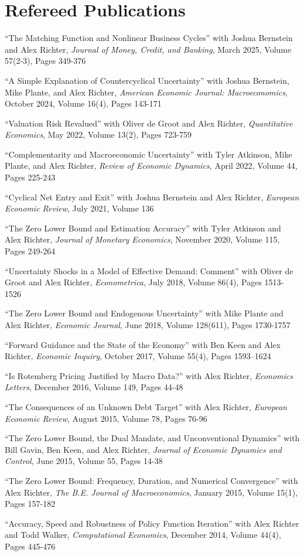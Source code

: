 \documentclass[10pt,letterpaper,en-US]{article}
\begin{document}
\section*{Refereed Publications}
\begin{etaremune}
\item ``The Matching Function and Nonlinear Business Cycles'' with Joshua Bernstein and Alex Richter, \emph{Journal of Money, Credit, and Banking}, March 2025, Volume 57(2-3), Pages 349-376
\item ``A Simple Explanation of Countercyclical Uncertainty'' with Joshua Bernstein, Mike Plante, and Alex Richter, \emph{American Economic Journal: Macroeconomics}, October 2024, Volume 16(4), Pages 143-171
\item ``Valuation Risk Revalued'' with Oliver de Groot and Alex Richter, \emph{Quantitative Economics}, May 2022, Volume 13(2), Pages 723-759
\item ``Complementarity and Macroeconomic Uncertainty'' with Tyler Atkinson, Mike Plante, and Alex Richter, \emph{Review of Economic Dynamics}, April 2022, Volume 44, Pages 225-243
\item ``Cyclical Net Entry and Exit'' with Joshua Bernstein and Alex Richter, \emph{European Economic Review}, July 2021, Volume 136
\item ``The Zero Lower Bound and Estimation Accuracy'' with Tyler Atkinson and Alex Richter, \emph{Journal of Monetary Economics}, November 2020, Volume 115, Pages 249-264
\item ``Uncertainty Shocks in a Model of Effective Demand: Comment'' with Oliver de Groot and Alex Richter, \emph{Econometrica}, July 2018, Volume 86(4), Pages 1513-1526
\item ``The Zero Lower Bound and Endogenous Uncertainty'' with Mike Plante and Alex Richter, \emph{Economic Journal}, June 2018, Volume 128(611), Pages 1730-1757
\item ``Forward Guidance and the State of the Economy'' with Ben Keen and Alex Richter, \emph{Economic Inquiry}, October 2017, Volume 55(4), Pages 1593–1624
\item ``Is Rotemberg Pricing Justified by Macro Data?'' with Alex Richter, \emph{Economics Letters}, December 2016, Volume 149, Pages 44-48
\item ``The Consequences of an Unknown Debt Target'' with Alex Richter, \emph{European Economic Review}, August 2015, Volume 78, Pages 76-96
\item ``The Zero Lower Bound, the Dual Mandate, and Unconventional Dynamics'' with Bill Gavin, Ben Keen, and Alex Richter, \emph{Journal of Economic Dynamics and Control}, June 2015, Volume 55, Pages 14-38
\item ``The Zero Lower Bound: Frequency, Duration, and Numerical Convergence'' with Alex Richter, \emph{The B.E. Journal of Macroeconomics}, January 2015, Volume 15(1), Pages 157-182
\item ``Accuracy, Speed and Robustness of Policy Function Iteration'' with Alex Richter and Todd Walker, \emph{Computational Economics}, December 2014, Volume 44(4), Pages 445-476
\end{etaremune}
\end{document}

